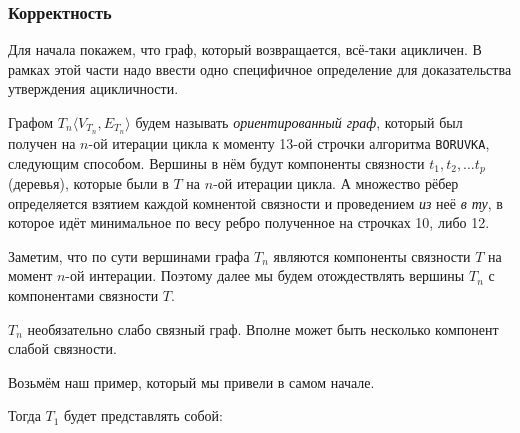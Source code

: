 \subsubsection{Корректность}

Для начала покажем, что граф, который возвращается, всё-таки ацикличен. В рамках этой части надо ввести одно специфичное определение для доказательства утверждения ацикличности.

\Def Графом $T_n\langle V_{T_n}, E_{T_n} \rangle$ будем называть \textit{ориентированный граф}, который был получен на $n$-ой итерации цикла к моменту 13-ой строчки алгоритма \texttt{BORUVKA}, следующим способом. 
Вершины в нём будут компоненты связности $t_1, t_2, \dots t_p$ (деревья), которые были в $T$ на $n$-ой итерации цикла. 
А множество рёбер определяется взятием каждой комнентой связности и проведением \textit{из} неё \textit{в ту}, в которое идёт минимальное по весу ребро полученное на строчках 10, либо 12.

\Note Заметим, что по сути вершинами графа $T_n$ являются компоненты связности $T$ на момент $n$-ой интерации. Поэтому далее мы будем отождествлять вершины $T_n$ с компонентами связности $T$.

\Note $T_n$ необязательно слабо связный граф. Вполне может быть несколько компонент слабой связности.

Возьмём наш пример, который мы привели в самом начале.

\begin{figure}[H]
    \centering
\end{figure}

Тогда $T_1$ будет представлять собой:
\begin{figure}[H]
    \centering
\end{figure}

